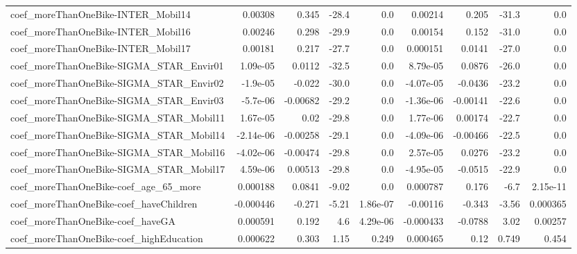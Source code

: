 \begin{tabular}{lrrrrrrrr}
coef\_moreThanOneBike-INTER\_Mobil14        &     0.00308 &        0.345 &   -28.4 &      0.0 &    0.00214 &       0.205 &        -31.3 &           0.0 \\
coef\_moreThanOneBike-INTER\_Mobil16        &     0.00246 &        0.298 &   -29.9 &      0.0 &    0.00154 &       0.152 &        -31.0 &           0.0 \\
coef\_moreThanOneBike-INTER\_Mobil17        &     0.00181 &        0.217 &   -27.7 &      0.0 &   0.000151 &      0.0141 &        -27.0 &           0.0 \\
coef\_moreThanOneBike-SIGMA\_STAR\_Envir01   &    1.09e-05 &       0.0112 &   -32.5 &      0.0 &   8.79e-05 &      0.0876 &        -26.0 &           0.0 \\
coef\_moreThanOneBike-SIGMA\_STAR\_Envir02   &    -1.9e-05 &       -0.022 &   -30.0 &      0.0 &  -4.07e-05 &     -0.0436 &        -23.2 &           0.0 \\
coef\_moreThanOneBike-SIGMA\_STAR\_Envir03   &    -5.7e-06 &     -0.00682 &   -29.2 &      0.0 &  -1.36e-06 &    -0.00141 &        -22.6 &           0.0 \\
coef\_moreThanOneBike-SIGMA\_STAR\_Mobil11   &    1.67e-05 &         0.02 &   -29.8 &      0.0 &   1.77e-06 &     0.00174 &        -22.7 &           0.0 \\
coef\_moreThanOneBike-SIGMA\_STAR\_Mobil14   &   -2.14e-06 &     -0.00258 &   -29.1 &      0.0 &  -4.09e-06 &    -0.00466 &        -22.5 &           0.0 \\
coef\_moreThanOneBike-SIGMA\_STAR\_Mobil16   &   -4.02e-06 &     -0.00474 &   -29.8 &      0.0 &   2.57e-05 &      0.0276 &        -23.2 &           0.0 \\
coef\_moreThanOneBike-SIGMA\_STAR\_Mobil17   &    4.59e-06 &      0.00513 &   -29.8 &      0.0 &  -4.95e-05 &     -0.0515 &        -22.9 &           0.0 \\
coef\_moreThanOneBike-coef\_age\_65\_more     &    0.000188 &       0.0841 &   -9.02 &      0.0 &   0.000787 &       0.176 &         -6.7 &      2.15e-11 \\
coef\_moreThanOneBike-coef\_haveChildren    &   -0.000446 &       -0.271 &   -5.21 & 1.86e-07 &   -0.00116 &      -0.343 &        -3.56 &      0.000365 \\
coef\_moreThanOneBike-coef\_haveGA          &    0.000591 &        0.192 &     4.6 & 4.29e-06 &  -0.000433 &     -0.0788 &         3.02 &       0.00257 \\
coef\_moreThanOneBike-coef\_highEducation   &    0.000622 &        0.303 &    1.15 &    0.249 &   0.000465 &        0.12 &        0.749 &         0.454 \\

\end{tabular}
